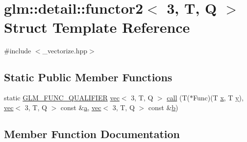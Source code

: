 \hypertarget{structglm_1_1detail_1_1functor2_3_013_00_01_t_00_01_q_01_4}{}\section{glm\+:\+:detail\+:\+:functor2$<$ 3, T, Q $>$ Struct Template Reference}
\label{structglm_1_1detail_1_1functor2_3_013_00_01_t_00_01_q_01_4}


{\ttfamily \#include $<$\+\_\+vectorize.\+hpp$>$}

\subsection*{Static Public Member Functions}
\begin{DoxyCompactItemize}
\item 
static \hyperlink{setup_8hpp_a33fdea6f91c5f834105f7415e2a64407}{G\+L\+M\+\_\+\+F\+U\+N\+C\+\_\+\+Q\+U\+A\+L\+I\+F\+I\+ER} \hyperlink{structglm_1_1vec}{vec}$<$ 3, T, Q $>$ \hyperlink{structglm_1_1detail_1_1functor2_3_013_00_01_t_00_01_q_01_4_ad26040a8693201baea2ceb8561d14209}{call} (T($\ast$Func)(T \hyperlink{_s_d_l__opengl_8h_ad0e63d0edcdbd3d79554076bf309fd47}{x}, T \hyperlink{_s_d_l__opengl_8h_a1675d9d7bb68e1657ff028643b4037e3}{y}), \hyperlink{structglm_1_1vec}{vec}$<$ 3, T, Q $>$ const \&\hyperlink{_s_d_l__opengl__glext_8h_a3309789fc188587d666cda5ece79cf82}{a}, \hyperlink{structglm_1_1vec}{vec}$<$ 3, T, Q $>$ const \&\hyperlink{_s_d_l__opengl__glext_8h_a0f71581a41fd2264c8944126dabbd010}{b})
\end{DoxyCompactItemize}


\subsection{Member Function Documentation}
\mbox{\label{structglm_1_1detail_1_1functor2_3_013_00_01_t_00_01_q_01_4_ad26040a8693201baea2ceb8561d14209}} 

